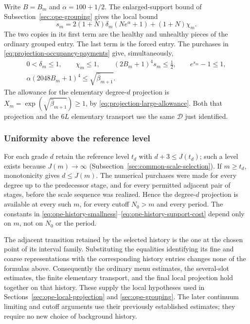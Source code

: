 Write $B=B_m$ and $\alpha=100+1/2$. The enlarged-support bound of
Subsection~\ref{sec:ope-grouping} gives the local bound
\begin{equation}\label{eq:ope-history-cluster-price}
 s_m=2(1+N)\delta_m(Ne^\alpha+1)+(1+N)\chi_m.
\end{equation}
The two copies in its first term are the healthy and unhealthy
pieces of the ordinary grouped entry. The last term is the forced
entry. The purchases in
\eqref{eq:projection-occupancy-payments} give, simultaneously,
\begin{gather}
 0<\delta_m\le1,\qquad \chi_m\le1,\qquad
 (2B_m+1)^4s_m\le\tfrac12,\qquad e^{s_m}-1\le1,
 \label{eq:ope-history-smallness}\\
 \alpha(2048B_m+1)^4\le\sqrt{\widehat\beta_{m+1}}.
 \label{eq:ope-history-support-cost}
\end{gather}
The allowance for the elementary degree-$d$ projection is
$X_m=\exp(\sqrt{\widehat\beta_{m+1}})\ge1$, by
\eqref{eq:projection-large-allowance}. Both that projection and the
$6L$ elementary transport use the same $\mathcal D$ just identified.

\subsubsection{Uniformity above the reference level}

For each grade $d$ retain the reference level $t_d$ with
$d+3\le J(t_d)$; such a level exists because $J(m)\to\infty$
(Subsection~\ref{sec:common-scale-selection}). If $m\ge t_d$, monotonicity gives
$d\le J(m)$. The numerical purchases were made for every degree
up to the predecessor stage, and for every permitted adjacent pair
of stages, before the scale sequence was realized. Hence the
degree-$d$ projection is available at every such $m$, for every
cutoff $N_0>m$ and every period. The constants in
\eqref{eq:ope-history-smallness}--\eqref{eq:ope-history-support-cost}
depend only on $m$, not on $N_0$ or the period.

The adjacent transition retained by the selected history is the one
at the chosen point of its interval family. Substituting the equalities
identifying its fine and coarse representations with the corresponding
history entries changes none of the formulas above. Consequently the
ordinary menu estimates, the several-slot estimates, the finite
elementary transport, and the final local projection hold together
on that history. These supply the local hypotheses used in
Sections~\ref{sec:ope-local-projection} and
\ref{sec:ope-grouping}. The later continuum limiting and cutoff
arguments use their previously established estimates; they require
no new choice of background history.
